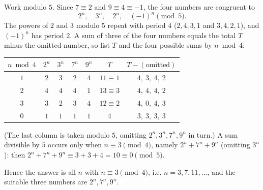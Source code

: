 Work modulo $5$. Since $7\equiv2$ and $9\equiv4\equiv-1$, the four numbers are congruent to
\[2^n,\quad 3^n,\quad 2^n,\quad (-1)^n \pmod 5.\]
The powers of $2$ and $3$ modulo $5$ repeat with period $4$ ($2,4,3,1$ and $3,4,2,1$), and $(-1)^n$ has period $2$. A sum of three of the four numbers equals the total $T$ minus the omitted number, so list $T$ and the four possible sums by $n\bmod4$:

\begin{center}
\begin{tabular}{c|cccc|c|c}
$n\bmod 4$ & $2^n$ & $3^n$ & $7^n$ & $9^n$ & $T$ & $T-(\text{omitted})$\\\hline
$1$ & $2$ & $3$ & $2$ & $4$ & $11\equiv1$ & $4,\ 3,\ 4,\ 2$\\
$2$ & $4$ & $4$ & $4$ & $1$ & $13\equiv3$ & $4,\ 4,\ 4,\ 2$\\
$3$ & $3$ & $2$ & $3$ & $4$ & $12\equiv2$ & $4,\ 0,\ 4,\ 3$\\
$0$ & $1$ & $1$ & $1$ & $1$ & $4$ & $3,\ 3,\ 3,\ 3$
\end{tabular}
\end{center}
(The last column is taken modulo $5$, omitting $2^n,3^n,7^n,9^n$ in turn.) A sum divisible by $5$ occurs only when $n\equiv3\pmod4$, namely $2^n+7^n+9^n$ (omitting $3^n$): then $2^n+7^n+9^n\equiv3+3+4=10\equiv0\pmod5$.

Hence the answer is all $n$ with $\boxed{n\equiv3\pmod 4}$, i.e. $n=3,7,11,\dots$, and the suitable three numbers are $2^n,7^n,9^n$.
